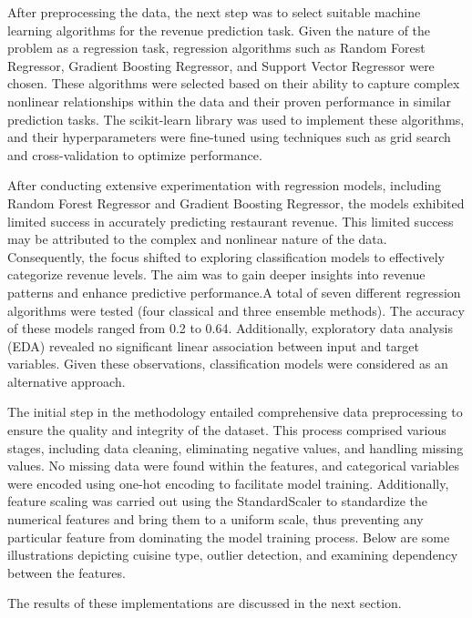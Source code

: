\documentclass{josis}
\begin{document}
After preprocessing the data, the next step was to select suitable machine learning algorithms for the revenue prediction task. Given the nature of the problem as a regression task, regression algorithms such as Random Forest Regressor, Gradient Boosting Regressor, and Support Vector Regressor were chosen. These algorithms were selected based on their ability to capture complex nonlinear relationships within the data and their proven performance in similar prediction tasks. The scikit-learn library was used to implement these algorithms, and their hyperparameters were fine-tuned using techniques such as grid search and cross-validation to optimize performance.

After conducting extensive experimentation with regression models, including Random Forest Regressor and Gradient Boosting Regressor, the models exhibited limited success in accurately predicting restaurant revenue. This limited success may be attributed to the complex and nonlinear nature of the data. Consequently, the focus shifted to exploring classification models to effectively categorize revenue levels. The aim was to gain deeper insights into revenue patterns and enhance predictive performance.A total of seven different regression algorithms were tested (four classical and three ensemble methods). The accuracy of these models ranged from 0.2 to 0.64. Additionally, exploratory data analysis (EDA) revealed no significant linear association between input and target variables. Given these observations, classification models were considered as an alternative approach.

The initial step in the methodology entailed comprehensive data preprocessing to ensure the quality and integrity of the dataset. This process comprised various stages, including data cleaning, eliminating negative values, and handling missing values. No missing data were found within the features, and categorical variables were encoded using one-hot encoding to facilitate model training. Additionally, feature scaling was carried out using the StandardScaler to standardize the numerical features and bring them to a uniform scale, thus preventing any particular feature from dominating the model training process. Below are some illustrations depicting cuisine type, outlier detection, and examining dependency between the features.

The results of these implementations are discussed in the next section.
\end{document}
